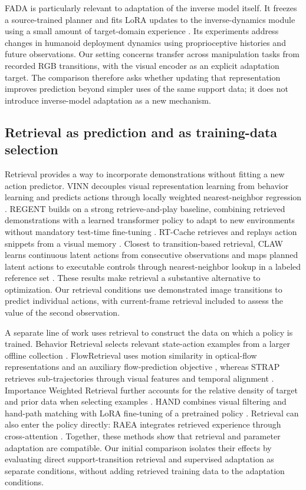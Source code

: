 \documentclass[11pt]{article}
\begin{document}
FADA is particularly relevant to adaptation of the inverse model itself. It freezes a source-trained planner and fits LoRA updates to the inverse-dynamics module using a small amount of target-domain experience \cite{fada}. Its experiments address changes in humanoid deployment dynamics using proprioceptive histories and future observations. Our setting concerns transfer across manipulation tasks from recorded RGB transitions, with the visual encoder as an explicit adaptation target. The comparison therefore asks whether updating that representation improves prediction beyond simpler uses of the same support data; it does not introduce inverse-model adaptation as a new mechanism.

\subsection*{Retrieval as prediction and as training-data selection}

Retrieval provides a way to incorporate demonstrations without fitting a new action predictor. VINN decouples visual representation learning from behavior learning and predicts actions through locally weighted nearest-neighbor regression \cite{vinn}. REGENT builds on a strong retrieve-and-play baseline, combining retrieved demonstrations with a learned transformer policy to adapt to new environments without mandatory test-time fine-tuning \cite{regent}. RT-Cache retrieves and replays action snippets from a visual memory \cite{rtcache}. Closest to transition-based retrieval, CLAW learns continuous latent actions from consecutive observations and maps planned latent actions to executable controls through nearest-neighbor lookup in a labeled reference set \cite{claw}. These results make retrieval a substantive alternative to optimization. Our retrieval conditions use demonstrated image transitions to predict individual actions, with current-frame retrieval included to assess the value of the second observation.

A separate line of work uses retrieval to construct the data on which a policy is trained. Behavior Retrieval selects relevant state-action examples from a larger offline collection \cite{behavior}. FlowRetrieval uses motion similarity in optical-flow representations and an auxiliary flow-prediction objective \cite{flow}, whereas STRAP retrieves sub-trajectories through visual features and temporal alignment \cite{strap}. Importance Weighted Retrieval further accounts for the relative density of target and prior data when selecting examples \cite{iwr}. HAND combines visual filtering and hand-path matching with LoRA fine-tuning of a pretrained policy \cite{hand}. Retrieval can also enter the policy directly: RAEA integrates retrieved experience through cross-attention \cite{raea}. Together, these methods show that retrieval and parameter adaptation are compatible. Our initial comparison isolates their effects by evaluating direct support-transition retrieval and supervised adaptation as separate conditions, without adding retrieved training data to the adaptation conditions.
\end{document}
